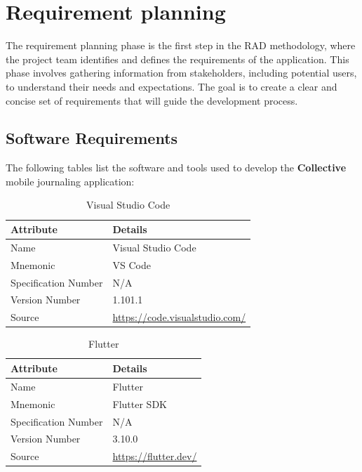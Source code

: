 \section{Requirement planning}\label{sec:requirementPlanning}   

The requirement planning phase is the first step in the RAD methodology, where the project team identifies and defines the requirements of the application. This phase involves gathering information from stakeholders, including potential users, to understand their needs and expectations. The goal is to create a clear and concise set of requirements that will guide the development process.

\subsection{Software Requirements}\label{subsec:softwareRequirements}

The following tables list the software and tools used to develop the \textbf{Collective} mobile journaling application:

\begin{table}[H]
\centering
\caption{Visual Studio Code}
\label{tab:vscode-metadata}
\begin{tabular}{|p{4cm}|p{10cm}|}
\hline
\textbf{Attribute} & \textbf{Details} \\
\hline
Name & Visual Studio Code \\
\hline
Mnemonic & VS Code \\
\hline
Specification Number & N/A \\
\hline
Version Number & 1.101.1 \\
\hline
Source & \url{https://code.visualstudio.com/} \\
\hline
\end{tabular}
\end{table}

\begin{table}[H]
\centering
\caption{Flutter}
\label{tab:flutter-metadata}
\begin{tabular}{|p{4cm}|p{10cm}|}
\hline
\textbf{Attribute} & \textbf{Details} \\
\hline
Name & Flutter \\
\hline
Mnemonic & Flutter SDK \\
\hline
Specification Number & N/A \\
\hline
Version Number & 3.10.0 \\
\hline
Source & \url{https://flutter.dev/} \\
\hline
\end{tabular}
\end{table}

